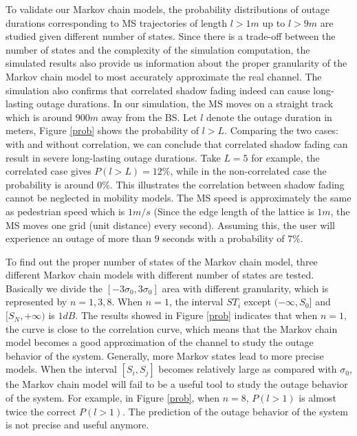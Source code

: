 \par To validate our Markov chain models, the probability distributions of outage durations corresponding to MS trajectories of length $l>1m$ up to $l>9m$ are studied given different number of states. Since there is a trade-off between the number of states and the complexity of the simulation computation, the simulated results also provide us information about the proper granularity of the Markov chain model to most accurately approximate the real channel. The simulation also confirms that correlated shadow fading indeed can cause long-lasting outage durations. In our simulation, the MS moves on a straight track which is around $900m$ away from the BS. Let $l$ denote the outage duration in meters, Figure \ref{prob} shows the probability of $l>L$. Comparing the two cases: with and without correlation, we can conclude that correlated shadow fading can result in severe long-lasting outage durations. Take $L=5$ for example, the correlated case gives $P(l>L)=12\%$, while in the non-correlated case the probability is around $0\%$. This illustrates the correlation between shadow fading cannot be neglected in mobility models. The MS speed is approximately the same as pedestrian speed which is $1m/s$ (Since the edge length of the lattice is $1m$, the MS moves one grid (unit distance) every second). Assuming this, the user will experience an outage of more than $9$ seconds with a probability of $7\%$.
\par To find out the proper number of states of the Markov chain model, three different Markov chain models with different number of states are tested. Basically we divide the $[-3\sigma_{0},3\sigma_{0}]$ area with different granularity, which is represented by $n=1,3,8$. When $n=1$, the interval $ST_{i}$ except $(-\infty,S_{0}]$ and $[S_{N},+\infty)$ is $1dB$. The results showed in Figure \ref{prob} indicates that when $n=1$, the curve is close to the correlation curve, which means that the Markov chain model becomes a good approximation of the channel to study the outage behavior of the system. Generally, more Markov states lead to more precise models. When the interval $[S_{i},S_{j}]$ becomes relatively large as compared with $\sigma_{0}$, the Markov chain model will fail to be a useful tool to study the outage behavior of the system. For example, in Figure \ref{prob}, when $n=8$, $P(l>1)$ is almost twice the correct $P(l>1)$. The prediction of the outage behavior of the system is not precise and useful anymore.
